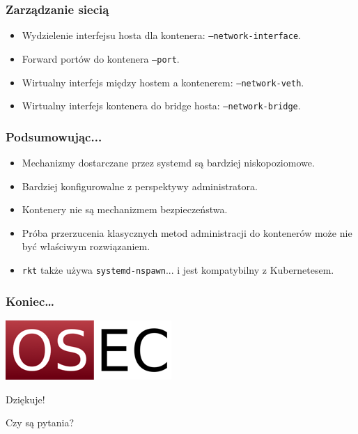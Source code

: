 \documentclass[dvipsnames,table]{beamer}
\begin{document}
\begin{frame}
\frametitle{Zarządzanie siecią}
\begin{itemize}
	\item Wydzielenie interfejsu hosta dla kontenera: {\tt --network-interface}.
	\item Forward portów do kontenera {\tt --port}.
	\item Wirtualny interfejs między hostem a kontenerem: {\tt --network-veth}.
	\item Wirtualny interfejs kontenera do bridge hosta: {\tt --network-bridge}.
\end{itemize}
\end{frame}

\begin{frame}
\frametitle{Podsumowując...}
\begin{itemize}
	\item Mechanizmy dostarczane przez systemd są bardziej niskopoziomowe.
	\item Bardziej konfigurowalne z perspektywy administratora.
	\item Kontenery nie są mechanizmem bezpieczeństwa.
	\item Próba przerzucenia klasycznych metod administracji do kontenerów może nie być właściwym rozwiązaniem.
	\item {\tt rkt} także używa {\tt systemd-nspawn}... i jest kompatybilny z Kubernetesem.
\end{itemize}	
\end{frame}

\begin{frame}
\frametitle{Koniec\ldots}
\begin{center}
\includegraphics[scale=0.5]{img-oseclogo.png}

Dziękuje!

Czy są pytania?

\end{center}
\end{frame}
\end{document}
